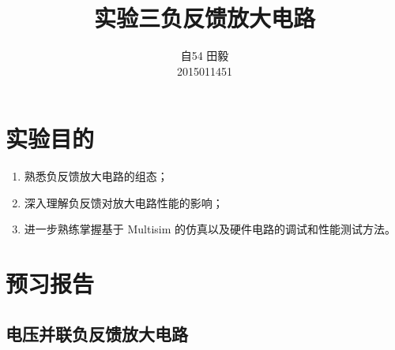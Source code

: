 \documentclass[12pt,a4paper]{article}
\title{实验三\quad 负反馈放大电路}
\author{自54 田毅\\ 2015011451}
\begin{document}
\begin{spacing}{1.3}

\maketitle
\tableofcontents
\newpage
\section{实验目的}
\begin{enumerate}
\item 熟悉负反馈放大电路的组态；
\item 深入理解负反馈对放大电路性能的影响；
\item 进一步熟练掌握基于 Multisim 的仿真以及硬件电路的调试和性能测试方法。
\end{enumerate}
\section{预习报告}
\subsection{电压并联负反馈放大电路}

\end{spacing}
\end{document}
